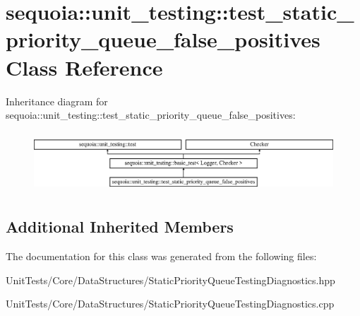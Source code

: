 \hypertarget{classsequoia_1_1unit__testing_1_1test__static__priority__queue__false__positives}{}\section{sequoia\+::unit\+\_\+testing\+::test\+\_\+static\+\_\+priority\+\_\+queue\+\_\+false\+\_\+positives Class Reference}
\label{classsequoia_1_1unit__testing_1_1test__static__priority__queue__false__positives}
Inheritance diagram for sequoia\+::unit\+\_\+testing\+::test\+\_\+static\+\_\+priority\+\_\+queue\+\_\+false\+\_\+positives\+:\begin{figure}[H]
\begin{center}
\leavevmode
\includegraphics[height=2.264151cm]{classsequoia_1_1unit__testing_1_1test__static__priority__queue__false__positives}
\end{center}
\end{figure}
\subsection*{Additional Inherited Members}


The documentation for this class was generated from the following files\+:\begin{DoxyCompactItemize}
\item 
Unit\+Tests/\+Core/\+Data\+Structures/Static\+Priority\+Queue\+Testing\+Diagnostics.\+hpp\item 
Unit\+Tests/\+Core/\+Data\+Structures/Static\+Priority\+Queue\+Testing\+Diagnostics.\+cpp\end{DoxyCompactItemize}
